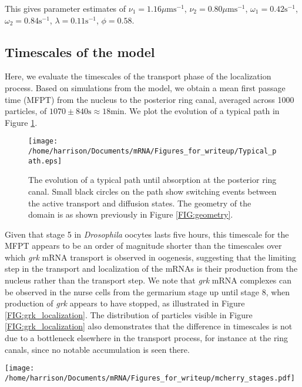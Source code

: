 \documentclass[twocolumn]{biophys}
\begin{document}
This gives parameter estimates of $\nu_1 = 1.16  \mu \text{ms}^{-1}$, $\nu_2 = 0.80  \mu \text{ms}^{-1}$, $\omega_1 = 0.42 \text{s}^{-1} $, $\omega_2 = 0.84 \text{s}^{-1}$, $\lambda = 0.11 \text{s}^{-1}$, $\phi = 0.58$.

\subsection{Timescales of the model}
Here, we evaluate the timescales of the transport phase of the localization process.
Based on simulations from the model, we obtain a mean first passage time (MFPT) from the nucleus to the posterior ring canal, averaged across 1000 particles, of $1070 \pm 840 \text{s} \approx 18 \text{min}$.
We plot the evolution of a typical path in Figure \ref{FIG:Typical_path}.
\begin{figure}[h]
 \centering
 \texttt{[image: /home/harrison/Documents/mRNA/Figures\_for\_writeup/Typical\_path.eps]}
 \caption{The evolution of a typical path until absorption at the posterior ring canal. 
 Small black circles on the path show switching events between the active transport and diffusion states. 
 The geometry of the domain is as shown previously in Figure \ref{FIG:geometry}.}
 \label{FIG:Typical_path}
\end{figure}
Given that stage 5 in \textit{Drosophila} oocytes lasts five hours, this timescale for the MFPT appears to be an order of magnitude shorter than the timescales over which \textit{grk} mRNA transport is observed in oogenesis, suggesting that the limiting step in the transport and localization of the mRNAs is their production from the nucleus rather than the transport step.
We note that \textit{grk} mRNA complexes can be observed in the nurse cells from the germarium stage up until stage 8, when production of \textit{grk} appears to have stopped, as illustrated in Figure \ref{FIG:grk_localization}.
The distribution of particles visible in Figure \ref{FIG:grk_localization} also demonstrates that the difference in timescales is not due to a bottleneck elsewhere in the transport process, for instance at the ring canals, since no notable accumulation is seen there.
\begin{figure*}
 \centering
 \texttt{[image: /home/harrison/Documents/mRNA/Figures\_for\_writeup/mcherry\_stages.pdf]}
 \caption{Localization of \textit{grk} mRNA at different stages of \textit{Drosophila} oogenesis. Increasing accumulation is seen in the oocyte over time. RNP particles can be seen in the nurse cell, until stage 8. The \textit{grk} mRNA was tagged with mcherry for visualization.}
 \label{FIG:grk_localization}
\end{figure*}
\end{document}
